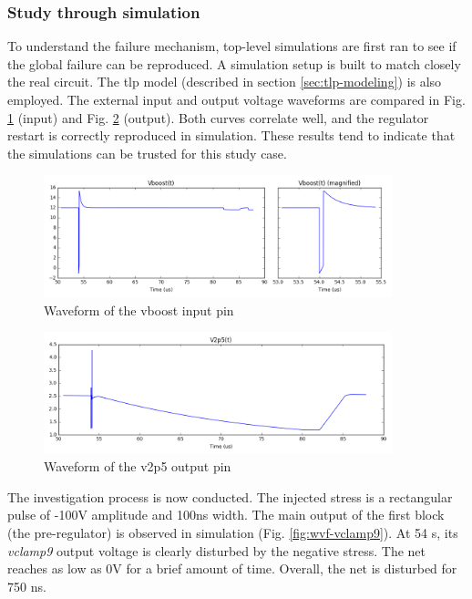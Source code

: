 \subsubsection{Study through simulation}

To understand the failure mechanism, top-level simulations are first ran to see if the global failure can be reproduced.
A simulation setup is built to match closely the real circuit.
The \gls{tlp} model (described in section \ref{sec:tlp-modeling}) is also employed.
The external input and output voltage waveforms are compared in Fig. \ref{fig:wvf-vboost} (input) and Fig. \ref{fig:wvf-v2p5} (output).
Both curves correlate well, and the regulator restart is correctly reproduced in simulation.
These results tend to indicate that the simulations can be trusted for this study case.

\begin{figure}[!htbp]
  \centering
  \includegraphics[width=0.9\textwidth]{src/3/figures/vboost.png}
  \caption{Waveform of the vboost input pin}
  \label{fig:wvf-vboost}
\end{figure}

\begin{figure}[!htbp]
  \centering
  \includegraphics[width=0.9\textwidth]{src/3/figures/v2p5.png}
  \caption{Waveform of the v2p5 output pin}
  \label{fig:wvf-v2p5}
\end{figure}

The investigation process is now conducted.
The injected stress is a rectangular pulse of -100V amplitude and 100ns width.
The main output of the first block (the pre-regulator) is observed in simulation (Fig. \ref{fig:wvf-vclamp9}).
At 54 \textmugreek{}s, its \textit{vclamp9} output voltage is clearly disturbed by the negative stress.
The net reaches as low as 0V for a brief amount of time.
Overall, the net is disturbed for 750 ns.

